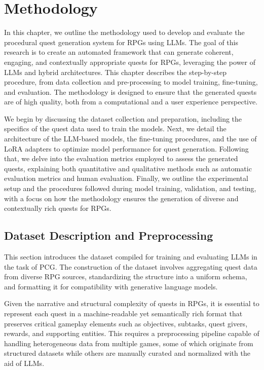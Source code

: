 \clearpage

\chapter{Methodology}

In this chapter, we outline the methodology used to develop and evaluate the procedural
quest generation system for RPGs using LLMs. The goal of this research is to create an
automated framework that can generate coherent, engaging, and contextually appropriate
quests for RPGs, leveraging the power of LLMs and hybrid architectures. This chapter
describes the step-by-step procedure, from data collection and pre-processing to model
training, fine-tuning, and evaluation. The methodology is designed to ensure that the
generated quests are of high quality, both from a computational and a user experience
perspective.

We begin by discussing the dataset collection and preparation, including the specifics
of the quest data used to train the models. Next, we detail the architecture of the LLM-based
models, the fine-tuning procedures, and the use of LoRA adapters to optimize model
performance for quest generation. Following that, we delve into the evaluation metrics
employed to assess the generated quests, explaining both quantitative and qualitative
methods such as automatic evaluation metrics and human evaluation. Finally, we outline
the experimental setup and the procedures followed during model training, validation,
and testing, with a focus on how the methodology ensures the generation of diverse and
contextually rich quests for RPGs.

\section{Dataset Description and Preprocessing}

This section introduces the dataset compiled for training and evaluating LLMs in the task
of PCG. The construction of the dataset involves aggregating quest data from diverse
RPG sources, standardizing the structure into a uniform schema, and formatting it for
compatibility with generative language models.

Given the narrative and structural complexity of quests in RPGs, it is essential to
represent each quest in a machine-readable yet semantically rich format that preserves
critical gameplay elements such as objectives, subtasks, quest givers, rewards, and supporting
entities. This requires a preprocessing pipeline capable of handling heterogeneous
data from multiple games, some of which originate from structured datasets while others
are manually curated and normalized with the aid of LLMs.


